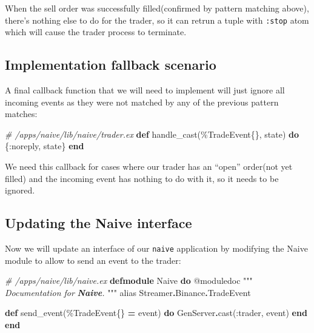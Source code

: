 \documentclass[
  oneside]{book}
\newenvironment{Shaded}{\begin{snugshade}}{\end{snugshade}}
\newcommand{\CommentTok}[1]{\textcolor[rgb]{0.56,0.35,0.01}{\textit{#1}}}
\newcommand{\ConstantTok}[1]{\textcolor[rgb]{0.00,0.00,0.00}{#1}}
\newcommand{\ImportTok}[1]{#1}
\newcommand{\InformationTok}[1]{\textcolor[rgb]{0.56,0.35,0.01}{\textbf{\textit{#1}}}}
\newcommand{\KeywordTok}[1]{\textcolor[rgb]{0.13,0.29,0.53}{\textbf{#1}}}
\newcommand{\NormalTok}[1]{#1}
\newcommand{\OperatorTok}[1]{\textcolor[rgb]{0.81,0.36,0.00}{\textbf{#1}}}
\newcommand{\OtherTok}[1]{\textcolor[rgb]{0.56,0.35,0.01}{#1}}
\newcommand{\VariableTok}[1]{\textcolor[rgb]{0.00,0.00,0.00}{#1}}
\begin{document}
When the sell order was successfully filled(confirmed by pattern matching above), there's nothing else to do for the trader, so it can retrun a tuple with \texttt{:stop} atom which will cause the trader process to terminate.

\hypertarget{implementation-fallback-scenario}{%
\subsection{Implementation fallback scenario}\label{implementation-fallback-scenario}}

A final callback function that we will need to implement will just ignore all
incoming events as they were not matched by any of the previous pattern matches:

\begin{Shaded}
\begin{Highlighting}[]
  \CommentTok{\# /apps/naive/lib/naive/trader.ex}
  \KeywordTok{def}\NormalTok{ handle\_cast(\%}\ConstantTok{TradeEvent}\NormalTok{\{\}, state) }\KeywordTok{do}
\NormalTok{    \{}\VariableTok{:noreply}\NormalTok{, state\}}
  \KeywordTok{end}
\end{Highlighting}
\end{Shaded}

We need this callback for cases where our trader has an ``open'' order(not yet filled) and the incoming event has nothing to do with it, so it needs to be ignored.

\hypertarget{updating-the-naive-interface}{%
\subsection{Updating the Naive interface}\label{updating-the-naive-interface}}

Now we will update an interface of our \texttt{naive} application by modifying the Naive module to allow to send an event to the trader:

\begin{Shaded}
\begin{Highlighting}[]
\CommentTok{\# /apps/naive/lib/naive.ex}
\KeywordTok{defmodule} \ConstantTok{Naive} \KeywordTok{do}
  \OtherTok{@moduledoc """}
\CommentTok{  Documentation for }\InformationTok{\textasciigrave{}Naive\textasciigrave{}}\CommentTok{.}
\CommentTok{  }\OtherTok{"""}
  \ImportTok{alias} \ConstantTok{Streamer}\OperatorTok{.}\ConstantTok{Binance}\OperatorTok{.}\ConstantTok{TradeEvent}

  \KeywordTok{def}\NormalTok{ send\_event(\%}\ConstantTok{TradeEvent}\NormalTok{\{\} }\OperatorTok{=}\NormalTok{ event) }\KeywordTok{do}
    \ConstantTok{GenServer}\OperatorTok{.}\NormalTok{cast(}\VariableTok{:trader}\NormalTok{, event)}
  \KeywordTok{end}
\KeywordTok{end}
\end{Highlighting}
\end{Shaded}
\end{document}
